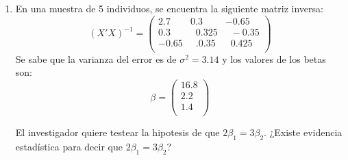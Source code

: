 \documentclass[10pt,a4paper]{article}
\begin{document}
\begin{enumerate}
\item En una muestra de 5 individuos, se encuentra la siguiente matriz inversa:
\[
(X'X)^{-1}=
\begin{pmatrix}
2.7 & 0.3 & -0.65 \\
0.3 & \;\;0.325 & \;\;-0.35 \\
-0.65 & \;\;.0.35 & \;\;0.425 \\
\end{pmatrix}
\]
Se sabe que la varianza del error es de $\sigma^2=3.14$ y los valores de los betas son:
\[
\beta=
\begin{pmatrix}
16.8 \\
2.2 \\
1.4 \\
\end{pmatrix}
\]

El investigador quiere testear la hipotesis de que $2\beta_1=3\beta_2$. ¿Existe evidencia estadística para decir que $2\beta_1=3\beta_2$?



\end{enumerate}

    
\end{document}
